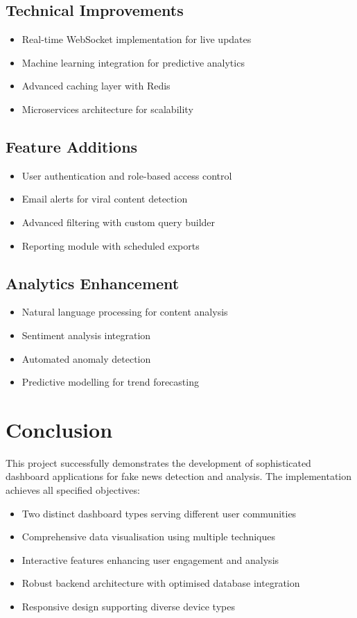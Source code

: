 \documentclass[12pt,a4paper]{article}
\begin{document}
\subsection{Technical Improvements}
\begin{itemize}
    \item Real-time WebSocket implementation for live updates
    \item Machine learning integration for predictive analytics
    \item Advanced caching layer with Redis
    \item Microservices architecture for scalability
\end{itemize}

\subsection{Feature Additions}
\begin{itemize}
    \item User authentication and role-based access control
    \item Email alerts for viral content detection
    \item Advanced filtering with custom query builder
    \item Reporting module with scheduled exports
\end{itemize}

\subsection{Analytics Enhancement}
\begin{itemize}
    \item Natural language processing for content analysis
    \item Sentiment analysis integration
    \item Automated anomaly detection
    \item Predictive modelling for trend forecasting
\end{itemize}

\section{Conclusion}

This project successfully demonstrates the development of sophisticated dashboard applications for fake news detection and analysis. The implementation achieves all specified objectives:

\begin{itemize}
    \item Two distinct dashboard types serving different user communities
    \item Comprehensive data visualisation using multiple techniques
    \item Interactive features enhancing user engagement and analysis
    \item Robust backend architecture with optimised database integration
    \item Responsive design supporting diverse device types
\end{itemize}
\end{document}
